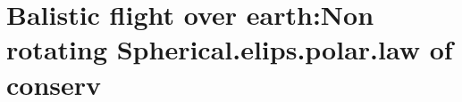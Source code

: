 \section{ Balistic flight over earth:Non rotating Spherical.elips.polar.law of conserv }\label{sec:q3}    
